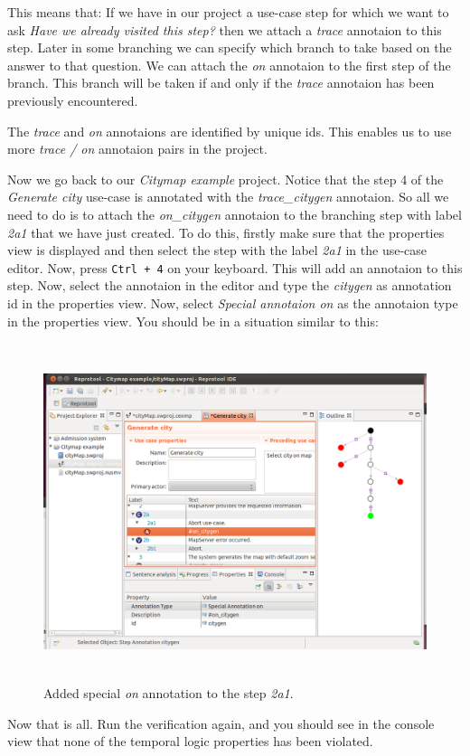 This means that: If we have in our project a use-case step for which we want to ask \emph{Have we already visited this step?} then
we attach a \emph{trace} annotaion to this step. Later in some branching we can specify which branch to take based on the answer
to that question. We can attach the \emph{on} annotaion to the first step of the branch. This branch will be taken if and only if
the \emph{trace} annotaion has been previously encountered.

The \emph{trace} and \emph{on} annotaions are identified by unique ids. This enables us to use more \emph{trace / on} annotaion
pairs in the project.

Now we go back to our \emph{Citymap example} project. Notice that the step 4 of the \emph{Generate city} use-case is annotated
with the \emph{trace\_citygen} annotaion. So all we need to do is to attach the \emph{on\_citygen} annotaion to the branching
step with label \emph{2a1} that we have just created. To do this, firstly make sure that the properties view is displayed and
then select the step with the label \emph{2a1} in the use-case editor. Now, press \texttt{Ctrl + 4} on your keyboard. This will
add an annotaion to this step. Now, select the annotaion in the editor and type the \emph{citygen} as annotation id in the
properties view. Now, select \emph{Special annotaion on} as the annotaion type in the properties view. You should be in a
situation similar to this:

\begin{figure}[ht]
  \centering
  \includegraphics[height=280pt]{images/reprotoolTraceCityMapFix2}
  \caption{Added special \emph{on} annotation to the step \emph{2a1}.}
  \label{fig:reprotoolTraceCityMapFix2}
\end{figure}

Now that is all. Run the verification again, and you should see in the console view that none of the temporal logic properties
has been violated.